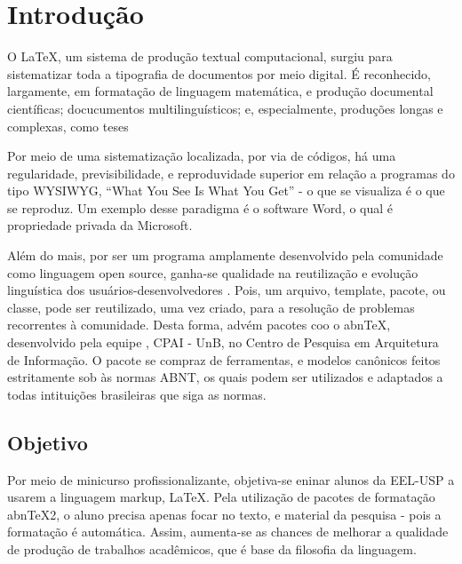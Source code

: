 \documentclass[
	12pt,				%
	openright,			%
	oneside,			%
	a4paper,			%
        brazil,				%
	]{abntex2}
\begin{document}
\textual

\chapter[Introdução]{Introdução}

O \LaTeX, um sistema de produção textual computacional, surgiu para
sistematizar toda a tipografia de documentos por meio digital. É
reconhecido, largamente, em formatação de linguagem matemática, e
produção documental científicas; docucumentos multilinguísticos; e,
especialmente, produções longas e complexas, como teses
\cite{ignat2005}

Por meio de uma sistematização localizada, por via de códigos, há uma
regularidade, previsibilidade, e reproduvidade superior em relação a
programas do tipo WYSIWYG, ``What You See Is What You Get'' - o que se
visualiza é o que se reproduz. Um exemplo desse paradigma é o software
Word, o qual é propriedade privada da Microsoft.

Além do mais, por ser um programa amplamente desenvolvido pela
comunidade como linguagem open source, ganha-se qualidade na
reutilização e evolução linguística dos usuários-desenvolvedores
\cite{goossens1994}. Pois, um arquivo, template, pacote, ou classe,
pode ser reutilizado, uma vez criado, para a resolução de problemas
recorrentes à comunidade. Desta forma, advém pacotes coo o abnTeX,
desenvolvido pela equipe \abnTeX, CPAI - UnB, no Centro de Pesquisa em
Arquitetura de Informação. O pacote se compraz de ferramentas, e
modelos canônicos feitos estritamente sob às normas ABNT, os quais
podem ser utilizados e adaptados a todas intituições brasileiras que
siga as normas.


\section{Objetivo}

Por meio de minicurso profissionalizante, objetiva-se eninar alunos da
EEL-USP a usarem a linguagem markup, \LaTeX. Pela utilização de
pacotes de formatação abnTeX2, o aluno precisa apenas focar no texto,
e material da pesquisa - pois a formatação é automática. Assim,
aumenta-se as chances de melhorar a qualidade de produção de trabalhos
acadêmicos, que é base da filosofia da linguagem.
\end{document}
